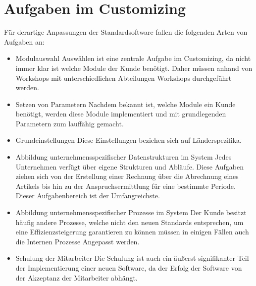 \section{Aufgaben im Customizing}
	\label{sec:aufgabenCustomizing}
	
	Für derartige Anpassungen der Standardsoftware fallen die folgenden Arten von Aufgaben an: 
	
	\begin{itemize}
		\item Modulauswahl
			\subitem Auswählen ist eine zentrale Aufgabe im Customizing, da nicht immer klar ist welche Module der Kunde benötigt. Daher müssen anhand von Workshops mit unterschiedlichen Abteilungen Workshops durchgeführt werden.
			
		\item Setzen von Parametern
			\subitem Nachdem bekannt ist, welche Module ein Kunde benötigt, werden diese Module implementiert und mit grundlegenden Parametern zum lauffähig gemacht. 
			
		\item Grundeinstellungen
			\subitem Diese Einstellungen beziehen sich auf Länderspezifika.
			
		\item Abbildung unternehmensspezifischer Datenstrukturen im System
			\subitem Jedes Unternehmen verfügt über eigene Strukturen und Abläufe. Diese Aufgaben ziehen sich von der Erstellung einer Rechnung über die Abrechnung eines Artikels bis hin zu der Anspruchsermittlung für eine bestimmte Periode. Dieser Aufgabenbereich ist der Umfangreichste.
		
		\item Abbildung unternehmensspezifischer Prozesse im System
			\subitem Der Kunde besitzt häufig andere Prozesse, welche nicht den neuen Standards entsprechen, um eine Effizienzsteigerung garantieren zu können müssen in einigen Fällen auch die Internen Prozesse Angepasst werden. 
		
		\item Schulung der Mitarbeiter
			\subitem Die Schulung ist auch ein äußerst signifikanter Teil der Implementierung einer neuen Software, da der Erfolg der Software von der Akzeptanz der Mitarbeiter abhängt. 
	\end{itemize}